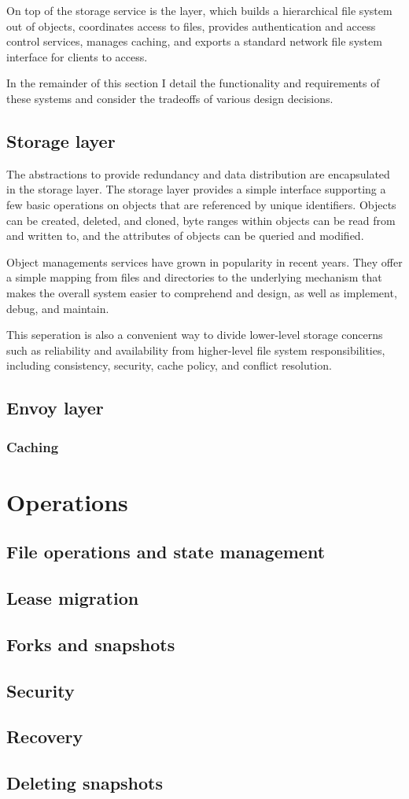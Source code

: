 On top of the storage service is the \envoy layer, which builds a hierarchical file system out of objects, coordinates access to files, provides authentication and access control services, manages caching, and exports a standard network file system interface for clients to access.

In the remainder of this section I detail the functionality and requirements of these systems and consider the tradeoffs of various design decisions.

\subsection{Storage layer}

The abstractions to provide redundancy and data distribution are encapsulated in the storage layer. The storage layer provides a simple interface supporting a few basic operations on objects that are referenced by unique identifiers. Objects can be created, deleted, and cloned, byte ranges within objects can be read from and written to, and the attributes of objects can be queried and modified.

Object managements services have grown in popularity in recent years. They offer a simple mapping from files and directories to the underlying mechanism that makes the overall system easier to comprehend and design, as well as implement, debug, and maintain.

This seperation is also a convenient way to divide lower-level storage concerns such as reliability and availability from higher-level file system responsibilities, including consistency, security, cache policy, and conflict resolution.




\subsection{Envoy layer}
\subsubsection{Caching}

\section{Operations}
\subsection{File operations and state management}
\subsection{Lease migration}
\subsection{Forks and snapshots}
\subsection{Security}
\subsection{Recovery}
\subsection{Deleting snapshots}